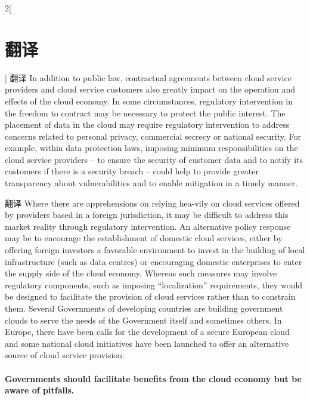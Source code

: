 \documentclass[a4paper, UTF8, 12pt]{article}
\begin{document}
\begin{paracol}{2}[\section{翻译}]
    \switchcolumn*
    翻译
    \switchcolumn
    In addition to public law, contractual agreements between cloud service providers and cloud service customers also greatly impact on the operation and effects of the cloud economy. In some circumstances, regulatory intervention in the freedom to contract may be necessary to protect the public interest. The placement of data in the cloud may require regulatory intervention to address concerns related to personal privacy, commercial secrecy or national security. For example, within data protection laws, imposing minimum responsibilities on the cloud service providers – to ensure the security of customer data and to notify its customers if there is a security breach – could help to provide greater transparency about vulnerabilities and to enable mitigation in a timely manner. 

    \switchcolumn*
    翻译
    \switchcolumn
    Where there are apprehensions on relying hea-vily on cloud services offered by providers based in a foreign jurisdiction, it may be difficult to address this market reality through regulatory intervention. An alternative policy response may be to encourage the establishment of domestic cloud services, either by offering foreign investors a favorable environment to invest in the building of local infrastructure (such as data centres) or encouraging domestic enterprises to enter the supply side of the cloud economy. Whereas such measures may involve regulatory components, such as imposing “localization” requirements, they would be designed to facilitate the provision of cloud services rather than to constrain them. Several Governments of developing countries are building government clouds to serve the needs of the Government itself and sometimes others. In Europe, there have been calls for the development of a secure European cloud and some national cloud initiatives have been launched to offer an alternative source of cloud service provision. 

    \switchcolumn*
    \paragraph{} 
    \switchcolumn
    {\bfseries Governments should facilitate benefits from the cloud economy but be aware of pitfalls.}


\end{paracol}
\end{document}
